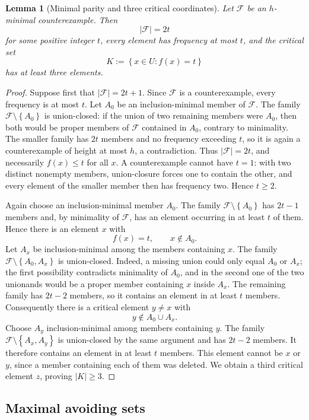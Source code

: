 \documentclass[11pt,reqno]{amsart}
\numberwithin{equation}{section}
\newtheorem{lemma}[lemma]{Lemma}
\theoremstyle{definition}
\theoremstyle{remark}
\newcommand{\F}{\mathcal{F}}
\newcommand{\1}{\mathbf{1}}
\newcommand{\set}[1]{\left\{#1\right\}}
\newcommand{\abs}[1]{\left|#1\right|}
\begin{document}
\begin{lemma}[Minimal parity and three critical coordinates]\label{lem:critical-three}
Let \(\F\) be an \(h\)-minimal counterexample.  Then
\[
\abs{\F}=2t
\]
for some positive integer \(t\), every element has frequency at most \(t\), and the critical set
\[
K:=\set{x\in U:f(x)=t}
\]
has at least three elements.
\end{lemma}

\begin{proof}
Suppose first that \(\abs{\F}=2t+1\).  Since \(\F\) is a counterexample, every frequency is at most \(t\).  Let \(A_0\) be an inclusion-minimal member of \(\F\).  The family \(\F\setminus\set{A_0}\) is union-closed: if the union of two remaining members were \(A_0\), then both would be proper members of \(\F\) contained in \(A_0\), contrary to minimality.  The smaller family has \(2t\) members and no frequency exceeding \(t\), so it is again a counterexample of height at most \(h\), a contradiction.  Thus \(\abs{\F}=2t\), and necessarily \(f(x)\le t\) for all \(x\).  A counterexample cannot have \(t=1\): with two distinct nonempty members, union-closure forces one to contain the other, and every element of the smaller member then has frequency two.  Hence \(t\ge2\).

Again choose an inclusion-minimal member \(A_0\).  The family \(\F\setminus\set{A_0}\) has \(2t-1\) members and, by minimality of \(\F\), has an element occurring in at least \(t\) of them.  Hence there is an element \(x\) with
\[
f(x)=t,
\qquad x\notin A_0.
\]
Let \(A_x\) be inclusion-minimal among the members containing \(x\).  The family
\(
\F\setminus\set{A_0,A_x}
\)
is union-closed.  Indeed, a missing union could only equal \(A_0\) or \(A_x\); the first possibility contradicts minimality of \(A_0\), and in the second one of the two unionands would be a proper member containing \(x\) inside \(A_x\).  The remaining family has \(2t-2\) members, so it contains an element in at least \(t\) members.  Consequently there is a critical element \(y\ne x\) with
\[
y\notin A_0\cup A_x.
\]
Choose \(A_y\) inclusion-minimal among members containing \(y\).  The family
\(
\F\setminus\set{A_x,A_y}
\)
is union-closed by the same argument and has \(2t-2\) members.  It therefore contains an element in at least \(t\) members.  This element cannot be \(x\) or \(y\), since a member containing each of them was deleted.  We obtain a third critical element \(z\), proving \(\abs{K}\ge3\).
\end{proof}

\subsection{Maximal avoiding sets}
\end{document}
